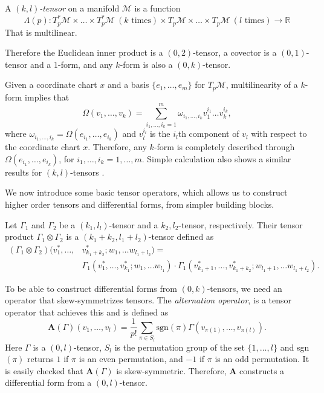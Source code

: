 \begin{definition}
A \emph{$(k,l)$-tensor} on a manifold $\mathcal M$ is a function 
\[
	\Lambda(p):T_p^*\mathcal M \times \dots \times T_p^*\mathcal M \ (k \text{ times}) \times T_p\mathcal M \times \dots \times T_p\mathcal M \ (l \text{ times}) \to \mathbb R
\]
That is multilinear.
\end{definition}
Therefore the Euclidean inner product is a $(0,2)$-tensor, a covector is a $(0,1)$-tensor and a $1$-form, and any $k$-form is also a $(0,k)$-tensor.

Given a coordinate chart $x$ and a basis $\{ e_1,\dots,e_m\}$ for $T_{p}\mathcal M$, multilinearity of a $k$-form implies that
\begin{equation}
	\Omega(v_1,\dots,v_k) = \sum_{i_1,\dots,i_k =1}^{m} \omega_{i_1,\dots,i_k} v_{1}^{i_1}\dots v_{k}^{i_k}, 
\end{equation}
where $\omega_{i_1,\dots,i_k} = \Omega(e_{i_1},\dots,e_{i_k})$ and $v_{l}^{i_l}$ is the $i_l$th component of $v_l$ with respect to the coordinate chart $x$. Therefore, any $k$-form is completely described through $\Omega(e_{i_1},\dots,e_{i_k})$, for $i_1,\dots,i_k=1,\dots,m$. Simple calculation also shows a similar results for $(k,l)$-tensors \cite{Wald:106274}.

We now introduce some basic tensor operators, which allows us to construct higher order tensors and differential forms, from simpler building blocks.
\begin{definition}
	Let $\Gamma_1$ and $\Gamma_2$ be a $(k_1,l_l)$-tensor and a $k_2,l_2$-tensor, respectively. Their tensor product $\Gamma_1\otimes \Gamma_2$ is a $(k_1+k_2,l_1+l_2)$-tensor defined as
\[
	\begin{aligned}
	(\Gamma_1\otimes \Gamma_2)(v^*_1,\dots,&v^*_{k_1+k_2};w_1,\dots w_{l_1+l_2}) = \\
		&\Gamma_1(v^*_1,\dots,v^*_{k_1};w_1,\dots w_{l_1})\cdot \Gamma_1(v^*_{k_1+1},\dots,v^*_{k_1+k_2};w_{l_1+1},\dots w_{l_1+l_2}).
	\end{aligned}
\]
\end{definition}
To be able to construct differential forms from $(0,k)$-tensors, we need an operator that skew-symmetrizes tensors. The \emph{alternation operator}, is a tensor operator that achieves this and is defined as
\begin{equation}
	\textbf{A}(\Gamma)(v_1,\dots,v_l) = \frac{1}{p!} \sum_{\pi \in S_l} \text{sgn}(\pi) \Gamma(v_{\pi(1)},\dots,v_{\pi(l)}).
\end{equation}
Here $\Gamma$ is a $(0,l)$-tensor, $S_l$ is the permutation group of the set $\{1,\dots,l\}$ and sgn$(\pi)$ returns $1$ if $\pi$ is an even permutation, and $-1$ if $\pi$ is an odd permutation. It is easily checked that $\textbf{A}(\Gamma)$ is skew-symmetric. Therefore, $\textbf{A}$ constructs a differential form from a $(0,l)$-tensor.

